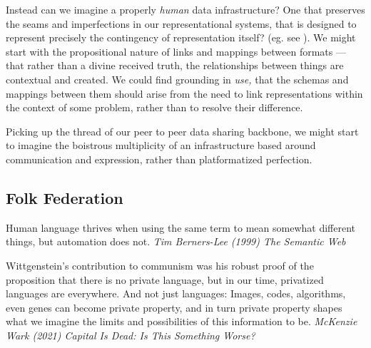 Instead can we imagine a properly \emph{human} data infrastructure? One
that preserves the seams and imperfections in our representational
systems, that is designed to represent precisely the contingency of
representation itself? (eg. see \citep{birhaneImpossibilityAutomatingAmbiguity2021, fletcher-watsonDiversityComputing2018}). We might start with the propositional nature of
links and mappings between formats --- that rather than a divine
received truth, the relationships between things are contextual and
created. We could find grounding in \emph{use,} that the schemas and
mappings between them should arise from the need to link representations
within the context of some problem, rather than to resolve their
difference.

Picking up the thread of our peer to peer data sharing backbone, we
might start to imagine the boistrous multiplicity of an infrastructure
based around communication and expression, rather than platformatized
perfection.

\hypertarget{folk-federation}{%
\subsection{Folk Federation}\label{folk-federation}}

\begin{leftbar}
Human language thrives when using the same term to mean somewhat
different things, but automation does not. \emph{Tim Berners-Lee (1999)
The Semantic Web} \citep{berners-leeSemanticWeb2001} 
\end{leftbar}

\begin{leftbar}
Wittgenstein's contribution to communism was his robust proof of the
proposition that there is no private language, but in our time,
privatized languages are everywhere. And not just languages: Images,
codes, algorithms, even genes can become private property, and in turn
private property shapes what we imagine the limits and possibilities of
this information to be. \emph{McKenzie Wark (2021) Capital Is Dead: Is
This Something Worse?} \citep{warkCapitalDeadThis2021} 
\end{leftbar}

